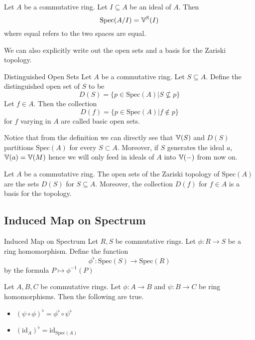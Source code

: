 \documentclass[a4paper]{article}
\begin{document}
\begin{prp}{}{} Let $A$ be a commutative ring. Let $I\subseteq A$ be an ideal of $A$. Then $$\text{Spec}(A/I)=\mathbb{V}^\text{S}(I)$$ where equal refers to the two spaces are equal. 
\end{prp}

We can also explicitly write out the open sets and a basis for the Zariski topology. 

\begin{defn}{Distinguished Open Sets}{} Let $A$ be a commutative ring. Let $S\subseteq A$. Define the distinguished open set of $S$ to be $$D(S)=\{p\in\text{Spec}(A)|S\not\subseteq p\}$$ Let $f\in A$. Then the collection $$D(f)=\{p\in\text{Spec}(A)|f\notin p\}$$ for $f$ varying in $A$ are called basic open sets. 
\end{defn}

Notice that from the definition we can directly see that $\mathbb{V}(S)$ and $D(S)$ partitions $\text{Spec}(A)$ for every $S\subset A$. Moreover, if $S$ generates the ideal $a$, $\mathbb{V}(a)=\mathbb{V}(M)$ hence we will only feed in ideals of $A$ into $\mathbb{V}(-)$ from now on. 

\begin{thm}{}{} Let $A$ be a commutative ring. The open sets of the Zariski topology of $\text{Spec}(A)$ are the sets $D(S)$ for $S\subseteq A$. Moreover, the collection $D(f)$ for $f\in A$ is a basis for the topology. 
\end{thm}

\subsection{Induced Map on Spectrum}
\begin{defn}{Induced Map on Spectrum}{} Let $R,S$ be commutative rings. Let $\phi:R\to S$ be a ring homomorphism. Define the function $$\phi^\flat:\text{Spec}(S)\to\text{Spec}(R)$$ by the formula $P\mapsto\phi^{-1}(P)$
\end{defn}

\begin{prp}{}{} Let $A,B,C$ be commutative rings. Let $\phi:A\to B$ and $\psi:B\to C$ be ring homomorphisms. Then the following are true. 
\begin{itemize}
\item $(\psi\circ\phi)^\flat=\phi^\flat\circ\psi^\flat$
\item $(\text{id}_A)^\flat=\text{id}_{\text{Spec}(A)}$
\end{itemize}
\end{prp}
\end{document}
